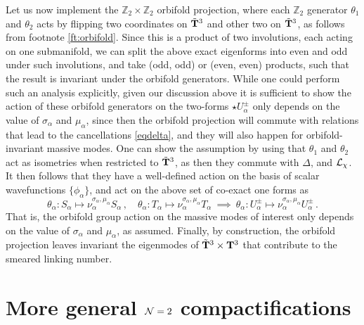 \documentclass[11pt]{article}
\def\a {\alpha}
\def\CN {{\cal N}}
\def\be{\begin{equation}}
\def\ee{\end{equation}}
\def\th {{\theta}}
\newcommand{\IZ}{\mathbb{Z}}
\begin{document}
Let us now implement the $\IZ_2 \times \IZ_2$ orbifold projection, where each $\IZ_2$ generator $\th_1$ and $\th_2$ acts by flipping two coordinates on $\tilde{\bf T}^3$ and other two on $\tilde{\bf T}^3$, as follows from footnote \ref{ft:orbifold}. Since this is a product of two involutions, each acting on one submanifold, we can split the above exact eigenforms into even and odd under such involutions, and take (odd, odd) or (even, even) products, such that the result is invariant under the orbifold generators. While one could perform such an analysis explicitly, given our discussion above it is sufficient to show the action of these orbifold generators on the two-forms $\star U_\a^\pm$ only depends on the value of $\sigma_\a$ and $\mu_\a$, since then the orbifold projection will commute with relations that lead to the cancellations \eqref{eqdelta}, and they will also happen for orbifold-invariant massive modes. One can  show the assumption by using that $\th_1$ and $\th_2$ act as isometries when restricted to $\tilde{\bf T}^3$, as then they commute with $\Delta$, and ${\cal L}_\chi$. It then follows that they have a well-defined action on the basis of scalar wavefunctions $\{\phi_\a\}$, and act on the above set of co-exact one forms as
\be
\th_\a : S_\a \mapsto \nu_\a^{\sigma_\a, \mu_\a} S_\a   \, , \quad \th_\a : T_\a \mapsto \nu_\a^{\sigma_\a, \mu_\a} T_\a\  \implies \ \th_\a : U_\a^\pm  \mapsto \nu_\a^{\sigma_\a, \mu_\a}  U_\a^\pm\, .
\ee
That is, the orbifold group action on the massive modes of interest only depends on the value of $\sigma_\a$ and $\mu_\a$, as assumed. Finally, by construction, the orbifold projection leaves invariant the eigenmodes of $\tilde{\bf T}^3 \times {\bf T}^3$ that contribute to the smeared linking number. 




\section{More general $\CN=2$ compactifications}
\label{s:general}
\end{document}
